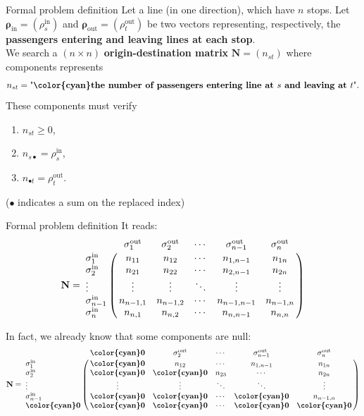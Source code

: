 \documentclass[10pt]{beamer}
\newcommand{\imp}[1]{\textbf{\color{cyan}#1}}
\begin{document}
	
	\begin{frame}{Formal problem definition}
		Let a line (in one direction), which have $n$ stops. Let $\bm{\rho}_\text{in} = (\rho^\text{in}_s)$ and $\bm{\rho}_\text{out} = (\rho^\text{out}_t)$ be two vectors representing, respectively, the \imp{passengers entering and leaving lines at each stop}. \\
		\vspace{0.4cm}
		We search a $(n \times n)$ \imp{origin-destination matrix} $\mathbf{N} = (n_{st})$ where components represents
		$$
			n_{st} = \text{"\imp{the number of passengers entering line at $s$ and leaving at $t$}"}.
		$$
		These components must verify
		\begin{enumerate}
			\item $n_{st} \geq 0$,
			\item $n_{s\bullet} = \rho^\text{in}_s$,
			\item $n_{\bullet t} = \rho^\text{out}_t$.
		\end{enumerate}
		\small ($\bullet$ indicates a sum on the replaced index)
	\end{frame}
	
	
	\begin{frame}{Formal problem definition}
		\small
		It reads:
		$$
		\mathbf{N} = \bordermatrix{
			& \sigma^\text{out}_1 & \sigma^\text{out}_2  & \cdots & \sigma^\text{out}_{n-1} & \sigma^\text{out}_n   \cr
			\sigma^\text{in}_1 & n_{11} & n_{12} & \cdots & n_{1,n-1} & n_{1n} \cr
			\sigma^\text{in}_2 & n_{21} & n_{22} & \cdots & n_{2,n-1} & n_{2n} \cr
			\vdots & \vdots & \vdots & \ddots & \vdots & \vdots \cr
			\sigma^\text{in}_{n-1} & n_{n-1,1} & n_{n-1,2} & \cdots & n_{n-1,n-1} & n_{n-1,n} \cr
			\sigma^\text{in}_{n} & n_{n,1} & n_{n,2} & \cdots & n_{n,n-1} & n_{n,n}}
		$$
		
		In fact, we already know that some components are null:
		$$
		\mathbf{N} = \bordermatrix{
			& \imp{0} & \sigma^\text{out}_2  & \cdots & \sigma^\text{out}_{n-1} & \sigma^\text{out}_n   \cr
			\sigma^\text{in}_1 & \imp{0} & n_{12} & \cdots & n_{1,n-1} & n_{1n} \cr
			\sigma^\text{in}_2 & \imp{0} & \imp{0} & n_{23} & \cdots & n_{2n} \cr
			\vdots & \vdots & \vdots & \ddots & \ddots & \vdots \cr
			\sigma^\text{in}_{n-1} & \imp{0} & \imp{0} & \cdots & \imp{0} & n_{n-1,n} \cr
			\imp{0} & \imp{0} & \imp{0} & \cdots & \imp{0} & \imp{0}}
		$$
	\end{frame}
	
\end{document}
